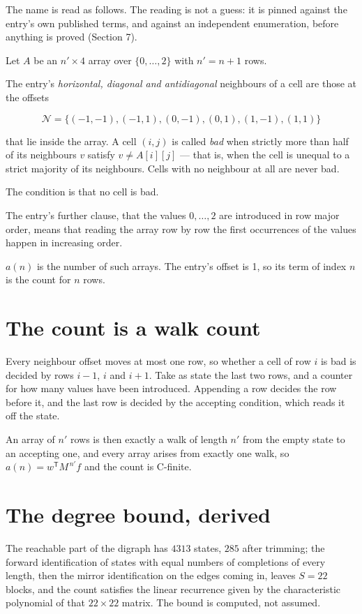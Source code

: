 \documentclass[11pt]{article}
\theoremstyle{definition}
\begin{document}
The name is read as follows. The reading is not a guess: it is pinned against the entry's own published terms, and against an independent enumeration, before anything is proved (Section 7).

Let $A$ be an $n' \times 4$ array over $\{0,\dots,2\}$ with $n' = n + 1$ rows.

The entry's {\itshape horizontal, diagonal and antidiagonal} neighbours of a cell are those at the offsets

\[\mathcal{N} = \{(-1,-1), (-1,1), (0,-1), (0,1), (1,-1), (1,1)\}\]

that lie inside the array. A cell $(i,j)$ is called {\itshape bad} when strictly more than half of its neighbours $v$ satisfy $v \ne A[i][j]$ --- that is, when the cell is unequal to a strict majority of its neighbours. Cells with no neighbour at all are never bad.

The condition is that no cell is bad.

The entry's further clause, that the values $0,\dots,2$ are introduced in row major order, means that reading the array row by row the first occurrences of the values happen in increasing order.

$a(n)$ is the number of such arrays. The entry's offset is 1, so its term of index $n$ is the count for $n$ rows.

\section{The count is a walk count}

Every neighbour offset moves at most one row, so whether a cell of row $i$ is bad is decided by rows $i-1$, $i$ and $i+1$. Take as state the last two rows, and a counter for how many values have been introduced. Appending a row decides the row before it, and the last row is decided by the accepting condition, which reads it off the state.

An array of $n'$ rows is then exactly a walk of length $n'$ from the empty state to an accepting one, and every array arises from exactly one walk, so $a(n) = w^{\mathsf T}M^{\,n'}f$ and the count is C-finite.

\section{The degree bound, derived}

The reachable part of the digraph has $4313$ states, $285$ after trimming; the forward identification of states with equal numbers of completions of every length, then the mirror identification on the edges coming in, leaves $S = 22$ blocks, and the count satisfies the linear recurrence given by the characteristic polynomial of that $22\times22$ matrix. The bound is computed, not assumed.
\end{document}

